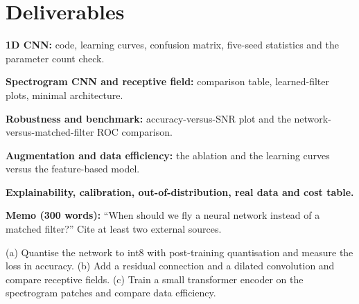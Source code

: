 \documentclass[11pt,a4paper]{article}
\begin{document}
\section*{Deliverables}
\begin{delivs}
  \item[D1] \textbf{1D CNN:} code, learning curves, confusion matrix, five-seed statistics and the parameter count check.
  \item[D2] \textbf{Spectrogram CNN and receptive field:} comparison table, learned-filter plots, minimal architecture.
  \item[D3] \textbf{Robustness and benchmark:} accuracy-versus-SNR plot and the network-versus-matched-filter ROC comparison.
  \item[D4] \textbf{Augmentation and data efficiency:} the ablation and the learning curves versus the feature-based model.
  \item[D5] \textbf{Explainability, calibration, out-of-distribution, real data and cost table.}
  \item[D6] \textbf{Memo (300 words):} ``When should we fly a neural network instead of a matched filter?'' Cite at least two external sources.
  \item[Bonus] (a) Quantise the network to int8 with post-training quantisation and measure the loss in accuracy. (b) Add a residual connection and a dilated convolution and compare receptive fields. (c) Train a small transformer encoder on the spectrogram patches and compare data efficiency.
\end{delivs}
\end{document}

